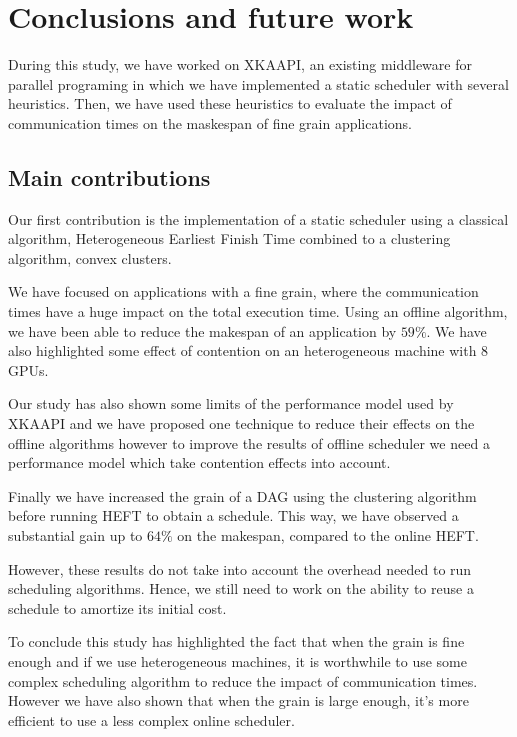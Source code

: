 \documentclass[10pt, conference, compsocconf,pdftex,dvipsnames]{IEEEtran}
\begin{document}
\section{Conclusions and future work}
\label{sec:cncl}
During this study, we have worked on
XKAAPI\cite{gautier2007kaapi,gautierxkaapi}, an existing middleware for parallel
programing in which we have implemented a static scheduler with several
heuristics. Then, we have used these heuristics to evaluate the impact of
communication times on the maskespan of fine grain applications.

\subsection{Main contributions}
\label{chap:cncl-contrib}

Our first contribution is the implementation of a static scheduler using
a classical algorithm, Heterogeneous Earliest Finish Time combined to a
clustering algorithm, convex clusters.

We have focused on applications with a fine grain, where the communication
times have a huge impact on the total execution time. Using an offline
algorithm, we have been able to reduce the makespan of an application by
$59\%$. We have also highlighted some effect of contention on an heterogeneous
machine with 8 GPUs. 

Our study has also shown some limits of the performance model used by XKAAPI
and we have proposed one technique to reduce their effects on the offline
algorithms however to improve the results of offline scheduler we need a
performance model which take contention effects into account.

Finally we have increased the grain of a DAG using the clustering algorithm
before running HEFT to obtain a schedule. This way, we have observed a
substantial gain up to $64\%$ on the makespan, compared to the online HEFT.

However, these results do not take into account the overhead needed to run
scheduling algorithms. Hence, we still need to work on the ability to reuse a
schedule to amortize its initial cost. 

To conclude this study has highlighted the fact that when the grain is fine
enough and if we use heterogeneous machines, it is worthwhile to use some 
complex scheduling algorithm to reduce the impact of communication times.
However we have also shown that when the grain is large enough, it's more
efficient to use a less complex online scheduler.
\end{document}
